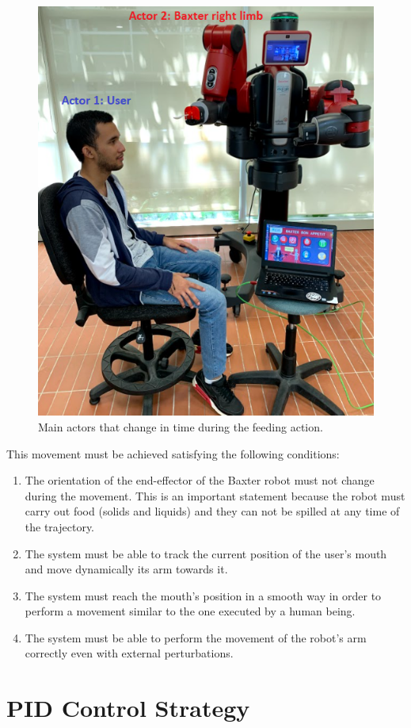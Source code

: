 \documentclass[11pt]{report} %
\begin{document}
\begin{figure}[H]
    \centering
    \includegraphics[width=0.7\linewidth]{assets/imgs/control_theory/control_theory_main_actors.png}
    \caption{Main actors that change in time during the feeding action.} 
    \label{fig_main_actors_control_theory}
\end{figure}

This movement must be achieved satisfying  the following conditions:

\begin{enumerate}
    \item The orientation of the end-effector of the Baxter robot must not change during the movement. This is an important statement because the robot must carry out food (solids and liquids) and they can not be spilled at any time of the trajectory.
    \item The system must be able to track the current position of the user's mouth and move dynamically its arm towards it.
    \item The system must reach the mouth's position in a smooth way in order to perform a movement similar to the one executed by a human being.
    \item The system must be able to perform the movement of the robot's arm  correctly even with external perturbations.
\end{enumerate}


\section{PID Control Strategy}
\end{document}
